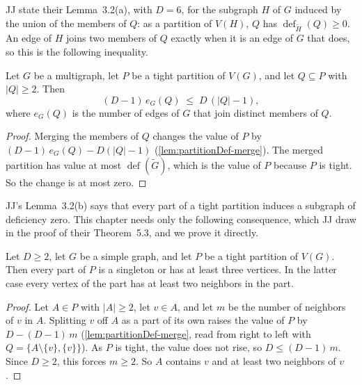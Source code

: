JJ state their Lemma~3.2(a), with $D = 6$, for the subgraph $H$ of $G$
induced by the union of the members of $Q$: as a partition of $V(H)$,
$Q$ has $\operatorname{def}_{\tilde H}(Q) \ge 0$. An edge of $H$ joins
two members of $Q$ exactly when it is an edge of $G$ that does, so this
is the following inequality.

\begin{lemma}
  \label{lem:tight-partition-subfamily}
  \leanok
  Let $G$ be a multigraph, let $P$ be a tight partition of $V(G)$, and
  let $Q \subseteq P$ with $|Q| \ge 2$. Then
  \[
    (D-1)\,e_G(Q) \;\le\; D\,(|Q| - 1),
  \]
  where $e_G(Q)$ is the number of edges of $G$ that join distinct
  members of $Q$.
\end{lemma}
\begin{proof}
  \leanok
  Merging the members of $Q$ changes the value of $P$ by
  $(D-1)\,e_G(Q) - D(|Q| - 1)$ (\cref{lem:partitionDef-merge}). The
  merged partition has value at most $\operatorname{def}(\tilde G)$,
  which is the value of $P$ because $P$ is tight. So the change is at
  most zero.
\end{proof}

JJ's Lemma~3.2(b) says that every part of a tight partition induces a
subgraph of deficiency zero. This chapter needs only the following
consequence, which JJ draw in the proof of their Theorem~5.3, and we
prove it directly.

\begin{lemma}
  \label{lem:tight-partition-parts}
  \leanok
  Let $D \ge 2$, let $G$ be a simple graph, and let $P$ be a tight
  partition of $V(G)$. Then every part of $P$ is a singleton or has at
  least three vertices. In the latter case every vertex of the part has
  at least two neighbors in the part.
\end{lemma}
\begin{proof}
  \leanok
  Let $A \in P$ with $|A| \ge 2$, let $v \in A$, and let $m$ be the
  number of neighbors of $v$ in $A$. Splitting $v$ off $A$ as a part of
  its own raises the value of $P$ by $D - (D-1)\,m$
  (\cref{lem:partitionDef-merge}, read from right to left with
  $Q = \{A \setminus \{v\}, \{v\}\}$). As $P$ is tight, the value does
  not rise, so $D \le (D-1)\,m$. Since $D \ge 2$, this forces $m \ge 2$.
  So $A$ contains $v$ and at least two neighbors of $v$.
\end{proof}

